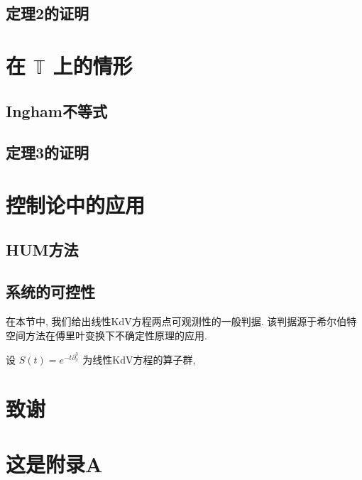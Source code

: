 \documentclass[master]{cugthesis}
\newcommand\T{\ensuremath{\mathbb{T}}}
\begin{document}
    \section{定理2的证明}
   
    \chapter{在 $\T$ 上的情形}
    \section{Ingham不等式}
    \section{定理3的证明}
    
    \chapter{控制论中的应用}
    \section{HUM方法}
    \section{系统的可控性}
    在本节中, 我们给出线性KdV方程两点可观测性的一般判据. 该判据源于希尔伯特空间方法在傅里叶变换下不确定性原理的应用.
    
    设 $S(t)=e^{-t\partial_x^3}$ 为线性KdV方程的算子群,
    

    \backmatter
    \chapter{致谢}

    \appendix
    \chapter{这是附录A}
\end{document}
